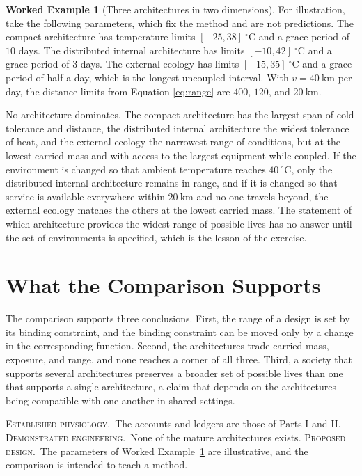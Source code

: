 \documentclass[11pt,openany]{book}
\theoremstyle{definition}
\newtheorem{example}{Worked Example}[chapter]
\theoremstyle{remark}
\newcommand{\est}{\textsc{Established physiology.}\ }
\newcommand{\dem}{\textsc{Demonstrated engineering.}\ }
\newcommand{\pro}{\textsc{Proposed design.}\ }
\begin{document}
\begin{example}[Three architectures in two dimensions]
\label{ex:threearch}
For illustration, take the following parameters, which fix the method and are not predictions. The compact architecture has temperature limits $[-25,38]\ ^\circ\mathrm{C}$ and a grace period of $10$ days. The distributed internal architecture has limits $[-10,42]\ ^\circ\mathrm{C}$ and a grace period of $3$ days. The external ecology has limits $[-15,35]\ ^\circ\mathrm{C}$ and a grace period of half a day, which is the longest uncoupled interval. With $v=40\ \mathrm{km}$ per day, the distance limits from Equation \eqref{eq:range} are $400$, $120$, and $20\ \mathrm{km}$.

No architecture dominates. The compact architecture has the largest span of cold tolerance and distance, the distributed internal architecture the widest tolerance of heat, and the external ecology the narrowest range of conditions, but at the lowest carried mass and with access to the largest equipment while coupled. If the environment is changed so that ambient temperature reaches $40\ ^\circ\mathrm{C}$, only the distributed internal architecture remains in range, and if it is changed so that service is available everywhere within $20\ \mathrm{km}$ and no one travels beyond, the external ecology matches the others at the lowest carried mass. The statement of which architecture provides the widest range of possible lives has no answer until the set of environments is specified, which is the lesson of the exercise.
\end{example}

\section{What the Comparison Supports}

The comparison supports three conclusions. First, the range of a design is set by its binding constraint, and the binding constraint can be moved only by a change in the corresponding function. Second, the architectures trade carried mass, exposure, and range, and none reaches a corner of all three. Third, a society that supports several architectures preserves a broader set of possible lives than one that supports a single architecture, a claim that depends on the architectures being compatible with one another in shared settings.

\begin{evidence}
\est The accounts and ledgers are those of Parts I and II. \dem None of the mature architectures exists. \pro The parameters of Worked Example~\ref{ex:threearch} are illustrative, and the comparison is intended to teach a method.
\end{evidence}
\end{document}

